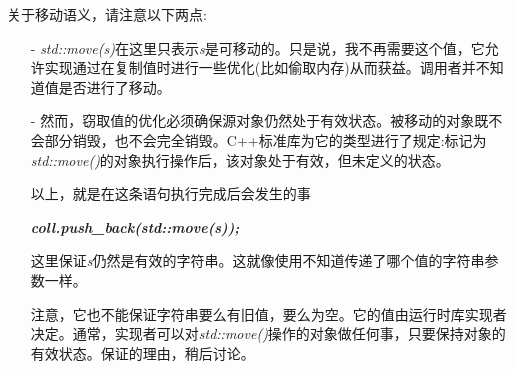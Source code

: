 \begin{itemize}
\begin{center}
	\end{center}
	关于移动语义，请注意以下两点:\par
	\begin{itemize}
		\item[-] \textit{std::move(s)}在这里只表示\textit{s}是可移动的。只是说，我不再需要这个值，它允许实现通过在复制值时进行一些优化(比如偷取内存)从而获益。调用者并不知道值是否进行了移动。
		\item[-] 然而，窃取值的优化必须确保源对象仍然处于有效状态。被移动的对象既不会部分销毁，也不会完全销毁。C++标准库为它的类型进行了规定:标记为\textit{std::move()}的对象执行操作后，该对象处于有效，但未定义的状态。\par
		以上，就是在这条语句执行完成后会发生的事\par
		\textit{\textbf{coll.push\_back(std::move(s));}}\par
		这里保证\textit{s}仍然是有效的字符串。这就像使用不知道传递了哪个值的字符串参数一样。\par
		注意，它也不能保证字符串要么有旧值，要么为空。它的值由运行时库实现者决定。通常，实现者可以对\textit{std::move()}操作的对象做任何事，只要保持对象的有效状态。保证的理由，稍后讨论。
	\end{itemize}
	

\end{itemize}
